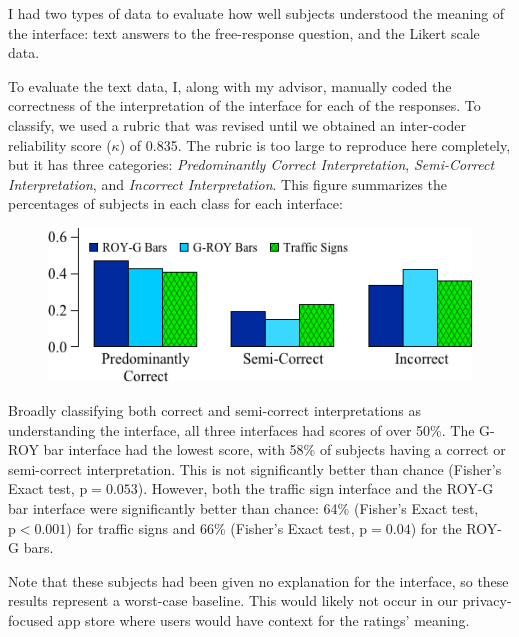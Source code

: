 \documentclass[11pt]{article}
\begin{document}
I had two types of data to evaluate how well subjects understood
the meaning of the interface: text answers to the free-response 
question, and the Likert scale data.

To evaluate the text data, I, along with my advisor, manually coded  the correctness
of the interpretation of the interface for each of 
the responses.
To classify, we used a rubric that was revised until we obtained an
inter-coder reliability score ($\kappa$) of 0.835. 
The rubric is too large to reproduce here completely, but it has three
categories: \emph{Predominantly Correct Interpretation},
\emph{Semi-Correct Interpretation}, and \emph{Incorrect Interpretation}.
This figure summarizes the percentages of subjects in
each class for each interface:

\begin{figure}[h]
\centering
    \includegraphics[width=.5\linewidth]{graphs/InterpPercentages.png}
    \label{text-cat}
\end{figure}
Broadly classifying both correct and semi-correct
interpretations as understanding the interface,
all three interfaces had scores of over 50\%. 
The G-ROY bar interface had the lowest 
score, with 58\% of 
subjects having a correct or semi-correct interpretation. This is not significantly better 
than chance (Fisher's Exact test, $\mathrm{p}=0.053$). However, both the traffic 
sign interface and the ROY-G bar interface were 
significantly better than chance:
64\% (Fisher's Exact test, $\mathrm{p}<0.001$) for traffic signs and
66\% (Fisher's Exact test, $\mathrm{p}=0.04$) for the ROY-G bars. 

Note that these subjects had been given no explanation for the
interface, so these results represent a worst-case baseline. 
This would likely not occur in
our privacy-focused app store where users would have 
context for the ratings' meaning.
\end{document}
